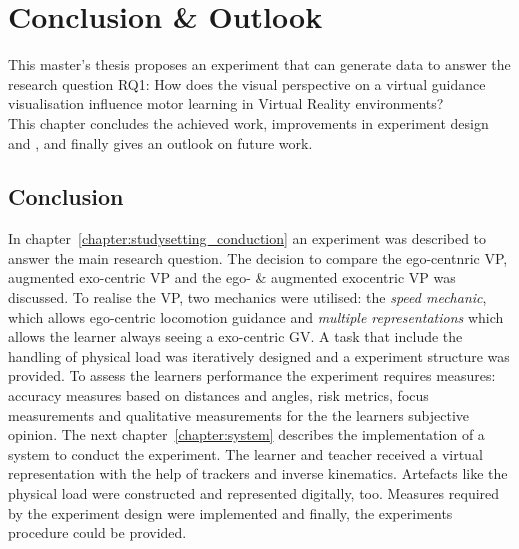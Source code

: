 \chapter{Conclusion \& Outlook}
\label{chapter:conclusion}

This master's thesis proposes an experiment that can generate data to answer the research question RQ1: How does the visual perspective on a virtual guidance visualisation influence motor learning in Virtual Reality environments?\\
This chapter concludes the achieved work, improvements in experiment design and \exgo, and finally gives an outlook on future work. 

\section{Conclusion}
In chapter~\ref{chapter:studysetting_conduction} an experiment was described to answer the main research question. The decision to compare the ego-centnric VP, augmented exo-centric VP and the ego- \& augmented exocentric VP was discussed. To realise the VP, two mechanics were utilised: the \textit{speed mechanic}, which allows ego-centric locomotion guidance and \textit{multiple representations} which allows the learner always seeing a exo-centric GV. A task that include the handling of physical load was iteratively designed and a experiment structure was provided. To assess the learners performance the experiment requires measures: accuracy measures based on distances and angles, risk metrics, focus measurements and qualitative measurements for the the learners subjective opinion. The next chapter~\ref{chapter:system} describes the implementation of a system to conduct the experiment. The learner and teacher received a virtual representation with the help of trackers and inverse kinematics. Artefacts like the physical load were constructed and represented digitally, too. Measures required by the experiment design were implemented and finally, the experiments procedure could be provided.\\

